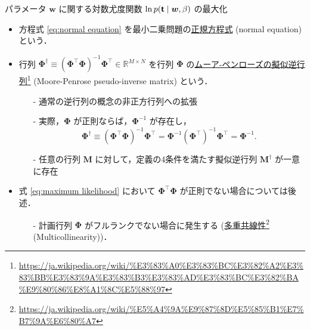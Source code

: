 \documentclass[uplatex,11pt,dvipdfmx,aspectratio=169,unicode,t]{beamer}
\numberwithin{equation}{section}
\newcommand{\BR}{\mathbb{R}}
\newcommand{\mb}[1]{\mathbf{#1}}
\newcommand{\tb}[1]{\textbf{#1}}
\newcommand{\ts}[1]{\textsf{#1}}
\newcommand{\bs}[1]{\boldsymbol{#1}}
\newcommand{\1}{\bs{1}}
\newcommand{\0}{\bs{0}}
\begin{document}
\begin{frame}{パラメータ $\bs{w}$ に関する対数尤度関数 $\ln p(\tb{\ts{t}} \mid \bs{w},\beta)$ の最大化}
    \begin{itemize}
        \item 方程式 \eqref{eq:normal equation} を最小二乗問題の\underline{正規方程式} (normal equation) という．
        \item 行列 $\bs{\Phi}^{\dagger} \equiv \left(\bs{\Phi}^{\top}\bs{\Phi}\right)^{-1} \bs{\Phi}^{\top} \in \BR^{M \times N}$ を行列 $\bs{\Phi}$ の\underline{ムーア-ペンローズの擬似逆行列}\footnote{\url{https://ja.wikipedia.org/wiki/\%E3\%83\%A0\%E3\%83\%BC\%E3\%82\%A2\%E3\%83\%BB\%E3\%83\%9A\%E3\%83\%B3\%E3\%83\%AD\%E3\%83\%BC\%E3\%82\%BA\%E9\%80\%86\%E8\%A1\%8C\%E5\%88\%97}} (Moore-Penrose pseudo-inverse matrix) という．
        \begin{itemize}
            \item[-] 通常の逆行列の概念の非正方行列への拡張
            \item[-] 実際，$\bs{\Phi}$ が正則ならば，$\bs{\Phi}^{-1}$ が存在し，
            \begin{equation}
                \bs{\Phi}^{\dagger} \equiv \left(\bs{\Phi}^{\top}\bs{\Phi}\right)^{-1} \bs{\Phi}^{\top} = \bs{\Phi}^{-1} \left(\bs{\Phi}^{\top}\right)^{-1} \bs{\Phi}^{\top} = \bs{\Phi}^{-1}.
            \end{equation}
            \item[-] 任意の行列 $\mb{M}$ に対して，定義の4条件を満たす擬似逆行列 $\mb{M}^{\dagger}$ が一意に存在
        \end{itemize}
        \item 式 \eqref{eq:maximum likelihood} において $\bs{\Phi}^{\top}\bs{\Phi}$ が正則でない場合については後述．
        \begin{itemize}
            \item[-] 計画行列 $\bs{\Phi}$ がフルランクでない場合に発生する (\underline{多重共線性}\footnote{\url{https://ja.wikipedia.org/wiki/\%E5\%A4\%9A\%E9\%87\%8D\%E5\%85\%B1\%E7\%B7\%9A\%E6\%80\%A7}} (Multicollinearity))．
        \end{itemize}
    \end{itemize}
\end{frame}
\end{document}
